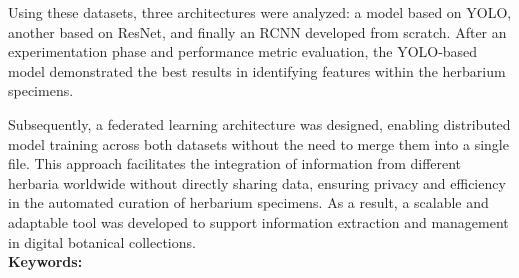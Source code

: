 Using these datasets, three architectures were analyzed: a model based on YOLO, another based on ResNet, and finally an RCNN developed from scratch. After an experimentation phase and performance metric evaluation, the YOLO-based model demonstrated the best results in identifying features within the herbarium specimens.

Subsequently, a federated learning architecture was designed, enabling distributed model training across both datasets without the need to merge them into a single file. This approach facilitates the integration of information from different herbaria worldwide without directly sharing data, ensuring privacy and efficiency in the automated curation of herbarium specimens. As a result, a scalable and adaptable tool was developed to support information extraction and management in digital botanical collections.
\\[2cm]
\textbf{Keywords:} \keywords

